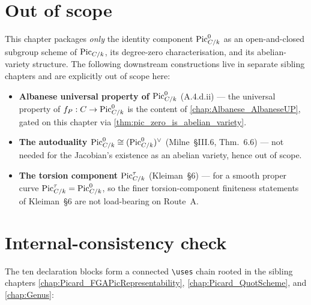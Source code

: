 \section{Out of scope}
\label{sec:pic0_out_of_scope}

This chapter packages \emph{only} the identity component
\(\operatorname{Pic}^0_{C/k}\) as an open-and-closed subgroup scheme of \(\operatorname{Pic}_{C/k}\),
its degree-zero characterisation, and its abelian-variety structure.
The following downstream constructions live in separate sibling
chapters and are explicitly out of scope here:

\begin{itemize}
  \item \textbf{Albanese universal property of \(\operatorname{Pic}^0_{C/k}\)}
    (A.4.d.ii) --- the universal property of \(f_P : C \to \operatorname{Pic}^0_{C/k}\)
    is the content of \cref{chap:Albanese_AlbaneseUP}, gated on this
    chapter via \cref{thm:pic_zero_is_abelian_variety}.
  \item \textbf{The autoduality \(\operatorname{Pic}^0_{C/k} \cong (\operatorname{Pic}^0_{C/k})^\vee\)}
    (Milne~\S III.6, Thm.~6.6) --- not needed for the Jacobian's
    existence as an abelian variety, hence out of scope.
  \item \textbf{The torsion component \(\operatorname{Pic}^\tau_{C/k}\)}
    (Kleiman~\S 6) --- for a smooth proper curve
    \(\operatorname{Pic}^\tau_{C/k} = \operatorname{Pic}^0_{C/k}\), so the finer torsion-component
    finiteness statements of Kleiman~\S 6 are not load-bearing on
    Route~A.
\end{itemize}

\section{Internal-consistency check}
\label{sec:pic0_consistency_check}

The ten declaration blocks form a connected \texttt{\textbackslash uses} chain rooted in
the sibling chapters \cref{chap:Picard_FGAPicRepresentability},
\cref{chap:Picard_QuotScheme}, and \cref{chap:Genus}:

